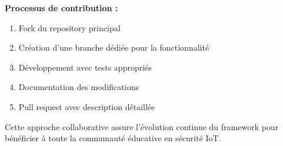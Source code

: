 \textbf{Processus de contribution :}
\begin{enumerate}
    \item Fork du repository principal
    \item Création d'une branche dédiée pour la fonctionnalité
    \item Développement avec tests appropriés
    \item Documentation des modifications
    \item Pull request avec description détaillée
\end{enumerate}

Cette approche collaborative assure l'évolution continue du framework pour bénéficier à toute la communauté éducative en sécurité IoT.